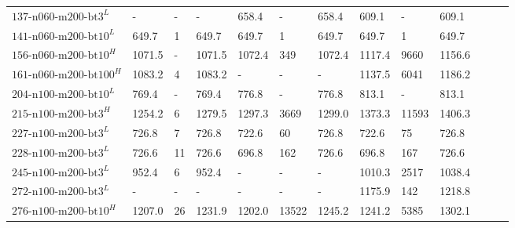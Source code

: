 \begin{landscape}
\begin{table}
\begin{tabular}{llllllllllrrr}
			$\text{137-n060-m200-bt3}^L$   & -                                & -                                  & -                                 & 658.4  & -     & 658.4  & 609.1  & -     & 609.1  \\
			$\text{141-n060-m200-bt10}^L$  & 649.7                            & 1                                  & 649.7                             & 649.7  & 1     & 649.7  & 649.7  & 1     & 649.7  \\
			$\text{156-n060-m200-bt10}^H$  & 1071.5                           & -                                  & 1071.5                            & 1072.4 & 349   & 1072.4 & 1117.4 & 9660  & 1156.6 \\
			$\text{161-n060-m200-bt100}^H$ & 1083.2                           & 4                                  & 1083.2                            & -      & -     & -      & 1137.5 & 6041  & 1186.2 \\
			$\text{204-n100-m200-bt10}^L$  & 769.4                            & -                                  & 769.4                             & 776.8  & -     & 776.8  & 813.1  & -     & 813.1  \\
			$\text{215-n100-m200-bt3}^H$   & 1254.2                           & 6                                  & 1279.5                            & 1297.3 & 3669  & 1299.0 & 1373.3 & 11593 & 1406.3 \\
			$\text{227-n100-m200-bt3}^L$   & 726.8                            & 7                                  & 726.8                             & 722.6  & 60    & 726.8  & 722.6  & 75    & 726.8  \\
			$\text{228-n100-m200-bt3}^L$   & 726.6                            & 11                                 & 726.6                             & 696.8  & 162   & 726.6  & 696.8  & 167   & 726.6  \\
			$\text{245-n100-m200-bt3}^L$   & 952.4                            & 6                                  & 952.4                             & -      & -     & -      & 1010.3 & 2517  & 1038.4 \\
			$\text{272-n100-m200-bt3}^L$   & -                                & -                                  & -                                 & -      & -     & -      & 1175.9 & 142   & 1218.8 \\
			$\text{276-n100-m200-bt10}^H$  & 1207.0                           & 26                                 & 1231.9                            & 1202.0 & 13522 & 1245.2 & 1241.2 & 5385  & 1302.1 \\

\end{tabular}
\end{table}
\end{landscape}
